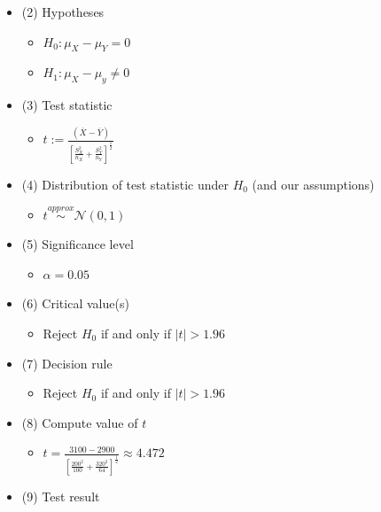 \documentclass{article}
\begin{document}
\begin{itemize}
\begin{itemize}
\begin{itemize}
            \end{itemize}
            \item (2) Hypotheses
            \begin{itemize}
                \item $H_0: \mu_X - \mu_Y = 0$
                \item $H_1: \mu_X - \mu_y \neq 0$
            \end{itemize}
            \item (3) Test statistic
            \begin{itemize}
                \item $t := \frac{(\overline{X} - \overline{Y})}{\left[ \frac{S_X^2}{n_X} + \frac{S_Y^2}{n_Y}\right]^\frac{1}{2}}$
            \end{itemize}
            \item (4) Distribution of test statistic under $H_0$ (and our assumptions)
            \begin{itemize}
                \item $t \overset{approx}{\sim} \mathcal{N}(0,1)$
            \end{itemize}
            \item (5) Significance level
            \begin{itemize}
                \item $\alpha = 0.05$
            \end{itemize}
            \item (6) Critical value(s)
            \begin{itemize}
                \item Reject $H_0$ if and only if $\vert t \vert > 1.96$
            \end{itemize}
            \item (7) Decision rule
            \begin{itemize}
                \item Reject $H_0$ if and only if $\vert t \vert > 1.96$
            \end{itemize}
            \item (8) Compute value of $t$
            \begin{itemize}
                \item $t = \frac{3100-2900}{\left[ \frac{200^2}{100} + \frac{320^2}{64} \right]^\frac{1}{2}} \approx 4.472$
            \end{itemize}
            \item (9) Test result
            \begin{itemize}

\end{itemize}
\end{itemize}
\end{itemize}
\end{document}
